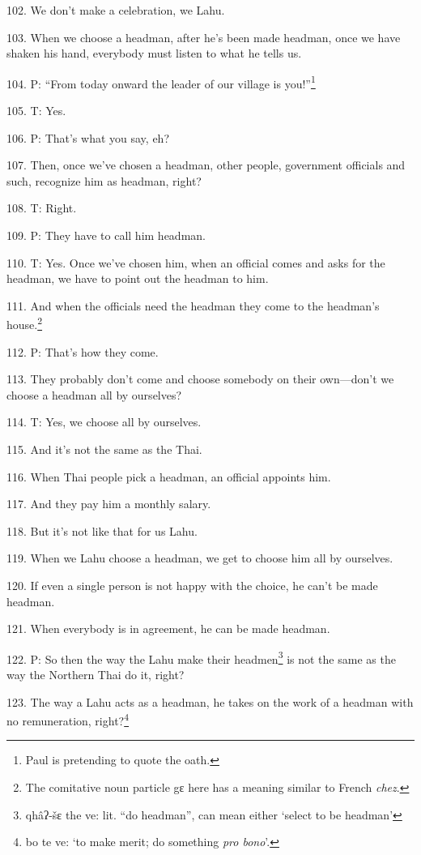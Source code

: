 102. We don't make a celebration, we Lahu.

103. When we choose a headman, after he's been made headman, once we have shaken
his hand, everybody must listen to what he tells us.

104. P: ``From today onward the leader of our village is you!''\footnote{Paul is pretending to quote the oath.}

105. T: Yes.

106. P: That's what you say, eh?

107. Then, once we've chosen a headman, other people, government officials and
such, recognize him as headman, right?

108. T: Right.

109. P: They have to call him headman.

110. T: Yes. Once we've chosen him, when an official comes and asks for the headman,
we have to point out the headman to him.

111. And when the officials need the headman they come to the headman's house.\footnote{The comitative noun particle gɛ here has a meaning similar to French \textit{chez}.}

112. P: That's how they come.

113. They probably don't come and choose somebody on their own---don't we choose
a headman all by ourselves?

114. T: Yes, we choose all by ourselves.

115. And it's not the same as the Thai.

116. When Thai people pick a headman, an official appoints him.

117. And they pay him a monthly salary.

118. But it's not like that for us Lahu.

119. When we Lahu choose a headman, we get to choose him all by ourselves.

120. If even a single person is not happy with the choice, he can't be made headman.

121. When everybody is in agreement, he can be made headman.

122. P: So then the way the Lahu make their headmen\footnote{qhâʔ-šɛ the ve: lit. ``do headman'', can mean either `select to be headman'} is not the same as the
way the Northern Thai do it, right?

123. The way a Lahu acts as a headman, he takes on the work of a headman with no
remuneration, right?\footnote{bo te ve: `to make merit; do something \textit{pro bono}'.}

